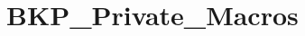 \hypertarget{group___b_k_p___private___macros}{\section{B\-K\-P\-\_\-\-Private\-\_\-\-Macros}
\label{group___b_k_p___private___macros}
}
